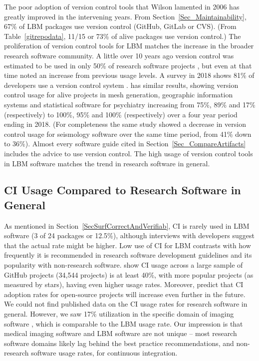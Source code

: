 \documentclass[final, 3p, times, authoryear]{elsarticle}
\begin{document}
The poor adoption of version control tools that Wilson lamented in 2006
\citep{Wilson2006} has greatly improved in the intervening years.  From
Section~\ref{Sec_Maintainability}, 67\% of LBM packages use version control
(GitHub, GitLab or CVS).  (From Table~\ref{gitrepodata}, 11/15 or 73\% of alive
packages use version control.)  The proliferation of version control tools for
LBM matches the increase in the broader research software community.  A little
over 10 years ago version control was estimated to be used in only 50\% of
research software projects \citep{Nguyen-HoanEtAl2010}, but even at that time
\citet{Nguyen-HoanEtAl2010} noted an increase from previous usage levels. A
survey in 2018 shows 81\% of developers use a version control system
\citep{AlNoamanyAndBorghi2018}.  \citet{Smith2018} has similar results, showing
version control usage for alive projects in mesh generation, geographic
information systems and statistical software for psychiatry increasing from
75\%, 89\% and 17\% (respectively) to 100\%, 95\% and 100\% (respectively) over
a four year period ending in 2018.  (For completeness the same study showed a
decrease in version control usage for seismology software over the same time
period, from 41\% down to 36\%).  Almost every software guide cited in
Section~\ref{Sec_CompareArtifacts} includes the advice to use version control.
The high usage of version control tools in LBM software matches the trend in
research software in general.

\subsection{CI Usage Compared to Research Software in General}

As mentioned in Section~\ref{SecSurfCorrectAndVerifiab}, CI is rarely used in
LBM software (3 of 24 packages or 12.5\%), although interviews with developers
suggest that the actual rate might be higher. Low use of CI for LBM contrasts
with how frequently it is recommended in research software development
guidelines
\citep{BrettEtAl2021, Brown2015, ThielEtAl2020, Zadka2018, vanGompelEtAl2016}
and its popularity with non-research software. \citet{HiltonEtAl2016} show CI
usage across a large sample of GitHub projects (34,544 projects) is at least
40\%, with more popular projects (as measured by stars), having even higher
usage rates. Moreover, \citet{HiltonEtAl2016} predict that CI adoption rates for
open-source projects will increase even further in the future.  We could not
find published data on the CI usage rates for research software in general.
However, we saw 17\% utilization in the specific domain of imaging software
\citep{Dong2021}, which is comparable to the LBM usage rate. Our impression is
that medical imaging software and LBM software are not unique -- most research
software domains likely lag behind the best practice recommendations, and
non-research software usage rates, for continuous integration.
\end{document}
